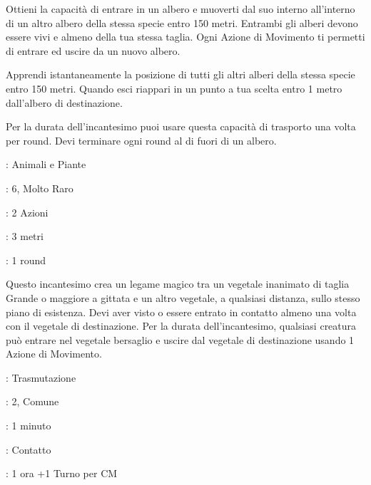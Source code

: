 \begin{multicols}{2}
Ottieni la capacità di entrare in un albero e muoverti dal suo interno all'interno di un altro albero della stessa specie entro 150 metri. Entrambi gli alberi devono essere vivi e almeno della tua stessa taglia. Ogni Azione di Movimento ti permetti di entrare ed uscire da un nuovo albero.

Apprendi istantaneamente la posizione di tutti gli altri alberi della stessa specie entro 150 metri. Quando esci riappari in un punto a tua scelta entro 1 metro dall'albero di destinazione.

Per la durata dell'incantesimo puoi usare questa capacità di trasporto una volta per round. Devi terminare ogni round al di fuori di un albero.

\noindent\colorbox{OBSSgold!10}{
\begin{minipage}{0.95\linewidth}
\begin{description}[noitemsep, topsep=0pt, parsep=0pt, partopsep=0pt, leftmargin=0cm, labelwidth=1.3cm]
	\item[\textbf{Lista}]: Animali e Piante
	\item[\textbf{Livello}]: 6, Molto Raro
	\item[\textbf{Lancio}]: 2 Azioni
	\item[\textbf{Gittata}]: 3 metri
	\item[\textbf{Durata}]: 1 round
\end{description}
\end{minipage}}\smallskip

Questo incantesimo crea un legame magico tra un vegetale inanimato di taglia Grande o maggiore a gittata e un altro vegetale, a qualsiasi distanza, sullo stesso piano di esistenza. Devi aver visto o essere entrato in contatto almeno una volta con il vegetale di destinazione. Per la durata dell'incantesimo, qualsiasi creatura può entrare nel vegetale bersaglio e uscire dal vegetale di destinazione usando 1 Azione di Movimento.

\noindent\colorbox{OBSSgold!10}{
\begin{minipage}{0.95\linewidth}
\begin{description}[noitemsep, topsep=0pt, parsep=0pt, partopsep=0pt, leftmargin=0cm, labelwidth=1.3cm]
	\item[\textbf{Lista}]: Trasmutazione
	\item[\textbf{Livello}]: 2, Comune
	\item[\textbf{Lancio}]: 1 minuto
	\item[\textbf{Gittata}]: Contatto
	\item[\textbf{Durata}]: 1 ora +1 Turno per CM
\end{description}
\end{minipage}}\smallskip


\end{multicols}
